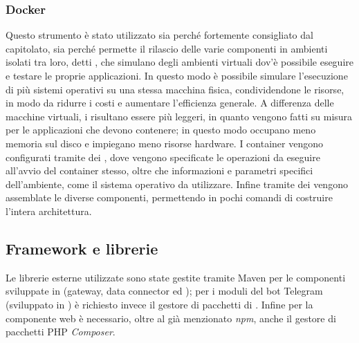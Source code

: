		\subsubsection{Docker}
			Questo strumento è stato utilizzato sia perché fortemente consigliato dal capitolato, sia perché permette il rilascio delle varie componenti in ambienti isolati tra loro, detti , che simulano degli ambienti virtuali dov'è possibile eseguire e testare le proprie applicazioni.
			\newline
			In questo modo è possibile simulare l'esecuzione di più sistemi operativi su una stessa macchina fisica, condividendone le risorse, in modo da ridurre i costi e aumentare l'efficienza generale.
			\newline
			A differenza delle macchine virtuali, i  risultano essere più leggeri, in quanto vengono fatti su misura per le applicazioni che devono contenere; in questo modo occupano meno memoria sul disco e impiegano meno risorse hardware.
			\newline
			I container vengono configurati tramite dei , dove vengono specificate le operazioni da eseguire all'avvio del container stesso, oltre che informazioni e parametri specifici dell'ambiente, come il sistema operativo  da utilizzare. Infine tramite dei  vengono assemblate le diverse componenti, permettendo in pochi comandi di costruire l'intera architettura.
	\subsection{Framework e librerie}
		Le librerie esterne utilizzate sono state gestite tramite Maven per le componenti sviluppate in  (gateway, data connector ed ); per i moduli del bot Telegram (sviluppato in ) è richiesto invece il gestore di pacchetti di  . Infine per la componente web è necessario, oltre al già menzionato \textit{npm}, anche il gestore di pacchetti PHP \textit{Composer}.
